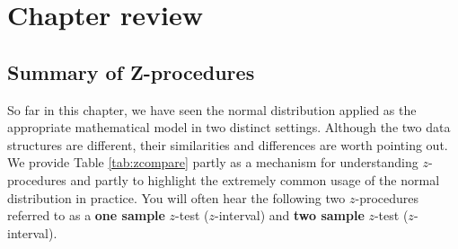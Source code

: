 \documentclass[
  10pt,
  openany]{book}
\theoremstyle{definition}
\theoremstyle{definition}
\theoremstyle{definition}
\theoremstyle{definition}
\theoremstyle{remark}
\begin{document}
 

\section{Chapter review}\label{chp15-review}

\subsection{Summary of Z-procedures}\label{summary-of-z-procedures}

So far in this chapter, we have seen the normal distribution applied as the appropriate mathematical model in two distinct settings. Although the two data structures are different, their similarities and differences are worth pointing out. We provide Table \ref{tab:zcompare} partly as a mechanism for understanding \(z\)-procedures and partly to highlight the extremely common usage of the normal distribution in practice. You will often hear the following two \(z\)-procedures referred to as a \textbf{one sample} \(z\)-test (\(z\)-interval) and \textbf{two sample} \(z\)-test (\(z\)-interval).
\end{document}
